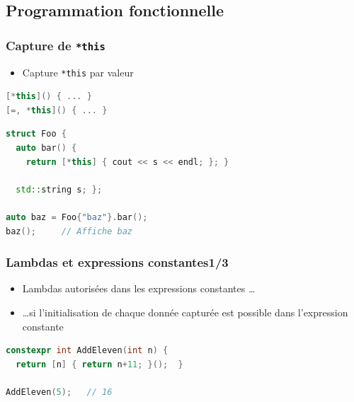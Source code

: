 \documentclass[C++.tex]{subfiles}
\begin{document}
\subsection*{Programmation fonctionnelle}
\begin{frame}[fragile]
	\frametitle{Capture de \lstinline|*this|}
	\begin{itemize}
		\item Capture \lstinline|*this| par valeur

	\end{itemize}

	\begin{lstlisting}[language=C++]
[*this]() { ... }
[=, *this]() { ... }\end{lstlisting}

	\begin{lstlisting}[language=C++]
struct Foo {
  auto bar() {
    return [*this] { cout << s << endl; }; }

  std::string s; };

auto baz = Foo{"baz"}.bar();
baz();     // Affiche baz\end{lstlisting}
\end{frame}

\begin{frame}[fragile]
	\frametitle{Lambdas et expressions constantes\titlehfill{}1/3}
	\begin{itemize}
		\item Lambdas autorisées dans les expressions constantes \ldots
		\item \ldots{}si l'initialisation de chaque donnée capturée est possible dans l'expression constante
	\end{itemize}

	\begin{lstlisting}[language=C++]
constexpr int AddEleven(int n) {
  return [n] { return n+11; }();  }

AddEleven(5);   // 16\end{lstlisting}
\end{frame}
\end{document}
